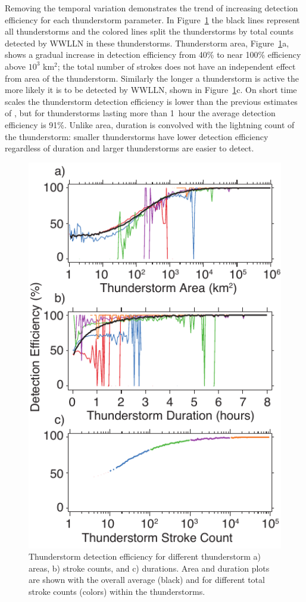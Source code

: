 Removing the temporal variation demonstrates the trend of increasing detection efficiency for each thunderstorm parameter.
In Figure~\ref{thunderstorm:fig:deParameter} the black lines represent all thunderstorms and the colored lines split the thunderstorms by total counts detected by WWLLN in these thunderstorms.
Thunderstorm area, Figure~\ref{thunderstorm:fig:deParameter}a, shows a gradual increase in detection efficiency from 40\% to near 100\% efficiency above $10^3$ km$^2$; the total number of strokes does not have an independent effect from area of the thunderstorm.
Similarly the longer a thunderstorm is active the more likely it is to be detected by WWLLN, shown in Figure~\ref{thunderstorm:fig:deParameter}c.
On short time scales the thunderstorm detection efficiency is lower than the previous estimates of \citet{Jacobson2006c}, but for thunderstorms lasting more than 1~hour the average detection efficiency is 91\%.
Unlike area, duration is convolved with the lightning count of the thunderstorm: smaller thunderstorms have lower detection efficiency regardless of duration and larger thunderstorms are easier to detect.


\begin{figure}[ht!]
   \centering
   \includegraphics[scale=1]{thunderstorm/Figures/deParameter.pdf}
   \caption{Thunderstorm detection efficiency for different thunderstorm a) areas, b) stroke counts, and c) durations.
           Area and duration plots are shown with the overall average (black) and for different total stroke counts (colors) within the thunderstorms.}
   \label{thunderstorm:fig:deParameter}
\end{figure}


